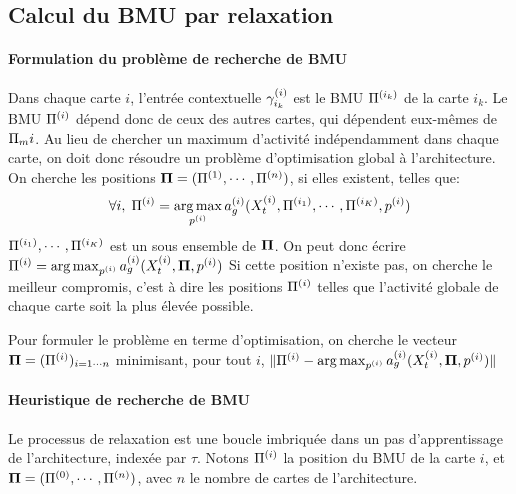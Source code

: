 \subsection{Calcul du BMU par relaxation}\label{sec:relax}

\paragraph{Formulation du problème de recherche de BMU}
Dans chaque carte $i$, l'entrée contextuelle $\gamma^{({i})}_{i_k}$ est le BMU $\Pi^{({i_k})}$  de la carte $i_k$. Le BMU $\Pi^{({i})}$ dépend donc de ceux des autres cartes, qui dépendent eux-mêmes de $\Pi_m{i}$. Au lieu de chercher un maximum d'activité indépendamment dans chaque carte, on doit donc résoudre un problème d'optimisation global à  l'architecture. On cherche les positions $\mathbf{\Pi} = (\Pi^{({1})}, \cdots, \Pi^{({n})})$, si elles existent, telles que:
\begin{equation}
\forall i, \; \Pi^{({i})} = \operatorname*{arg\,max}_{p^{({i})}} a_g^{({i})}(X^{({i})}_t, \Pi^{({i_1})}, \cdots, \Pi^{({i_K})},p^{({i})})
\end{equation}
$\Pi^{({i_1})}, \cdots, \Pi^{({i_K})}$ est un sous ensemble de $\mathbf{\Pi}$. On peut donc écrire $\Pi^{({i})} = \operatorname*{arg\,max}_{p^{({i})}} a_g^{({i})}(X^{({i})}_t, \mathbf{\Pi}, p^{({i})})$
Si cette position n'existe pas, on cherche le meilleur compromis, c'est à dire les positions $\Pi^{({i})}$ telles que l'activité globale de chaque carte soit la plus élevée possible.


Pour formuler le problème en terme d'optimisation, on cherche le vecteur $\mathbf{\Pi} = (\Pi^{({i})})_{i=1 \cdots n}$ minimisant, pour tout $i$, $\lVert \Pi^{({i})} - \operatorname*{arg\,max}_{p^{({i})}} a_g^{({i})}(X^{({i})}_t, \mathbf{\Pi}, p^{({i})}) \rVert$

\paragraph{Heuristique de recherche de BMU}
Le processus de relaxation est une boucle imbriquée dans un pas d'apprentissage de l'architecture, indexée par $\tau$. Notons $\Pi^{({i})}$ la position du BMU de la carte $i$, et $\mathbf{\Pi} = (\Pi^{({0})}, \cdots , \Pi^{({n})})$, avec $n$ le nombre de cartes de l'architecture.

